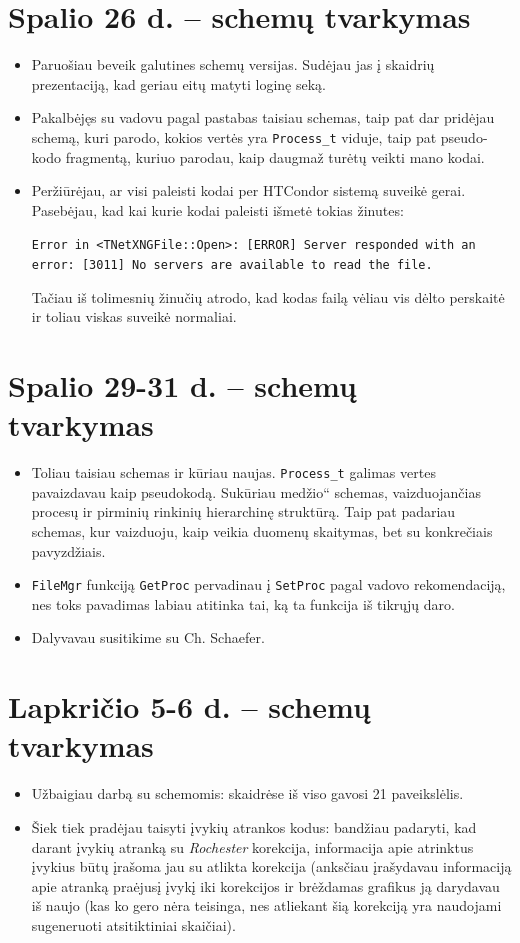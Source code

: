 \documentclass[a4paper, 12pt]{article}
\newcommand{\ltq}[1]{{\quotedblbase{}#1\textquotedblleft{}}}
\newcommand{\ttt}[1]{\texttt{#1}}
\begin{document}
\section{Spalio 26 d. -- schemų tvarkymas}
\begin{itemize}
	\item Paruošiau beveik galutines schemų versijas. Sudėjau jas į skaidrių prezentaciją,
	kad geriau eitų matyti loginę seką.
	\item Pakalbėjęs su vadovu pagal pastabas taisiau schemas, taip pat dar pridėjau
	schemą, kuri parodo, kokios vertės yra \ttt{Process\_t} viduje, taip pat pseudo-kodo
	fragmentą, kuriuo parodau, kaip daugmaž turėtų veikti mano kodai.
	
	\item Peržiūrėjau, ar visi paleisti kodai per HTCondor sistemą suveikė gerai.
	Pasebėjau, kad kai kurie kodai paleisti išmetė tokias žinutes:
	
	\ttt{Error in <TNetXNGFile::Open>: [ERROR] Server responded with an error:
	[3011] No servers are available to read the file.}
	
	Tačiau iš tolimesnių žinučių atrodo, kad kodas failą vėliau vis dėlto perskaitė
	ir toliau viskas suveikė normaliai.
\end{itemize}

\section{Spalio 29-31 d. -- schemų tvarkymas}
\begin{itemize}
	\item Toliau taisiau schemas ir kūriau naujas. \ttt{Process\_t} galimas vertes
	pavaizdavau kaip pseudokodą. Sukūriau \ltq{medžio} schemas, vaizduojančias procesų
	ir pirminių rinkinių hierarchinę struktūrą. Taip pat padariau schemas, kur vaizduoju,
	kaip veikia duomenų skaitymas, bet su konkrečiais pavyzdžiais.
	\item \ttt{FileMgr} funkciją \ttt{GetProc} pervadinau į \ttt{SetProc} pagal vadovo
	rekomendaciją, nes toks pavadimas labiau atitinka tai, ką ta funkcija iš tikrųjų
	daro.
	\item Dalyvavau susitikime su Ch. Schaefer.
\end{itemize}

\section{Lapkričio 5-6 d. -- schemų tvarkymas}
\begin{itemize}
	\item Užbaigiau darbą su schemomis: skaidrėse iš viso gavosi 21 paveikslėlis.
	\item Šiek tiek pradėjau taisyti įvykių atrankos kodus: bandžiau padaryti, kad darant
	įvykių atranką su \textit{Rochester} korekcija, informacija apie atrinktus įvykius
	būtų įrašoma jau su atlikta korekcija (anksčiau įrašydavau informaciją apie atranką
	praėjusį įvykį iki korekcijos ir brėždamas grafikus ją darydavau iš naujo (kas ko gero
	nėra teisinga, nes atliekant šią korekciją yra naudojami sugeneruoti atsitiktiniai skaičiai).
\end{itemize}
\end{document}
